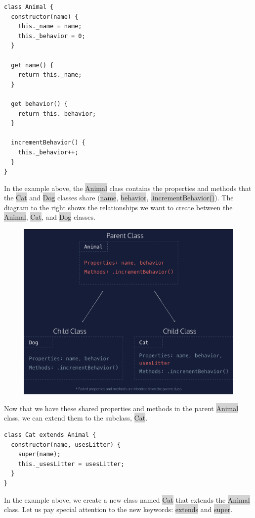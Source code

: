 \documentclass[11pt]{article}
\begin{document}
\begin{lstlisting}
class Animal {
  constructor(name) {
    this._name = name;
    this._behavior = 0;
  }

  get name() {
    return this._name;
  }

  get behavior() {
    return this._behavior;
  }   

  incrementBehavior() {
    this._behavior++;
  }
} 
\end{lstlisting}
In the example above, the \colorbox{lightgray}{Animal} class contains the properties and methods that the \colorbox{lightgray}{Cat} and \colorbox{lightgray}{Dog} classes share (\colorbox{lightgray}{name}, \colorbox{lightgray}{behavior}, \colorbox{lightgray}{.incrementBehavior()}). The diagram to the right shows the relationships we want to create between the \colorbox{lightgray}{Animal}, \colorbox{lightgray}{Cat}, and \colorbox{lightgray}{Dog} classes.
\begin{figure}[H]
\includegraphics[scale = 0.242]{12_1}
\centering
\end{figure}
Now that we have these shared properties and methods in the parent \colorbox{lightgray}{Animal} class, we can extend them to the subclass, \colorbox{lightgray}{Cat}.
\begin{lstlisting}
class Cat extends Animal {
  constructor(name, usesLitter) {
    super(name);
    this._usesLitter = usesLitter;
  }
}
\end{lstlisting}
In the example above, we create a new class named \colorbox{lightgray}{Cat} that extends the \colorbox{lightgray}{Animal} class. Let us pay special attention to the new keywords: \colorbox{lightgray}{extends} and \colorbox{lightgray}{super}.
\end{document}

